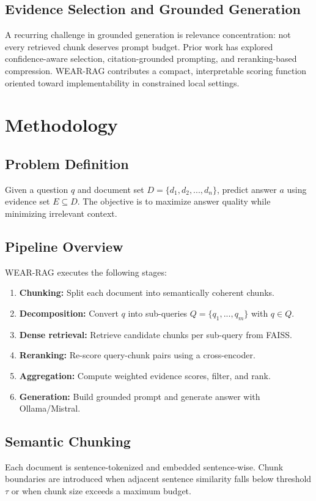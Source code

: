 \documentclass[10pt,draftclsnofoot,onecolumn,journal]{IEEEtran}
\begin{document}
\subsection{Evidence Selection and Grounded Generation}
A recurring challenge in grounded generation is relevance concentration: not every retrieved chunk deserves prompt budget. Prior work has explored confidence-aware selection, citation-grounded prompting, and reranking-based compression. WEAR-RAG contributes a compact, interpretable scoring function oriented toward implementability in constrained local settings.

\section{Methodology}
\subsection{Problem Definition}
Given a question $q$ and document set $D = \{d_1, d_2, ..., d_n\}$, predict answer $a$ using evidence set $E \subseteq D$. The objective is to maximize answer quality while minimizing irrelevant context.

\subsection{Pipeline Overview}
WEAR-RAG executes the following stages:
\begin{enumerate}
\item \textbf{Chunking:} Split each document into semantically coherent chunks.
\item \textbf{Decomposition:} Convert $q$ into sub-queries $Q = \{q_1, ..., q_m\}$ with $q \in Q$.
\item \textbf{Dense retrieval:} Retrieve candidate chunks per sub-query from FAISS.
\item \textbf{Reranking:} Re-score query-chunk pairs using a cross-encoder.
\item \textbf{Aggregation:} Compute weighted evidence scores, filter, and rank.
\item \textbf{Generation:} Build grounded prompt and generate answer with Ollama/Mistral.
\end{enumerate}

\subsection{Semantic Chunking}
Each document is sentence-tokenized and embedded sentence-wise. Chunk boundaries are introduced when adjacent sentence similarity falls below threshold $\tau$ or when chunk size exceeds a maximum budget.
\end{document}
